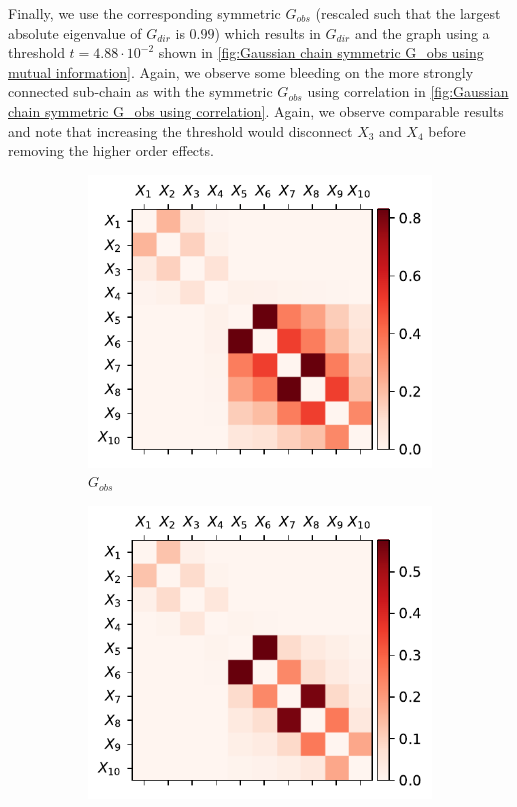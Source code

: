 \documentclass[../Thesis.tex]{subfiles}
\begin{document}
Finally, we use the corresponding symmetric $G_{obs}$ (rescaled such that the largest absolute eigenvalue of $G_{dir}$ is $0.99$) which results in $G_{dir}$ and the graph using a threshold $t=4.88\cdot 10^{-2}$ shown in \autoref{fig:Gaussian chain symmetric G_obs using mutual information}. Again, we observe some bleeding on the more strongly connected sub-chain as with the symmetric $G_{obs}$ using correlation in \autoref{fig:Gaussian chain symmetric G_obs using correlation}. Again, we observe comparable results and note that increasing the threshold would disconnect $X_3$ and $X_4$ before removing the higher order effects.
\begin{figure}[h]
    \centering
    \begin{subfigure}[t]{0.49\textwidth}
        \centering
        \includegraphics[width=.95\linewidth]{figures/Gaussian Chain Theoretical/symmetric G obs - MI.pdf}
        \caption{$G_{obs}$}
    \end{subfigure}
    \hfill
    \begin{subfigure}[t]{0.49\textwidth}
        \centering
        \includegraphics[width=.95\linewidth]{figures/Gaussian Chain Theoretical/G dir from symmetric G obs - MI.pdf}

\end{subfigure}
\end{figure}
\end{document}
